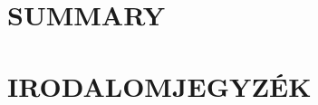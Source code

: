\documentclass[12pt,a4paper]{article}
\begin{document}
\clearpage
\section{SUMMARY}




\clearpage
\section{IRODALOMJEGYZÉK}
\printbibliography[heading=none]

\clearpage
\renewcommand{\listfigurename}{ÁBRAJEGYZÉK}
\listoffigures

\clearpage
\renewcommand{\listtablename}{TÁBLAJEGYZÉK}
\listoftables

\clearpage
\printacronyms[name=RÖVIDÍTÉSEK]

% 
\end{document}
